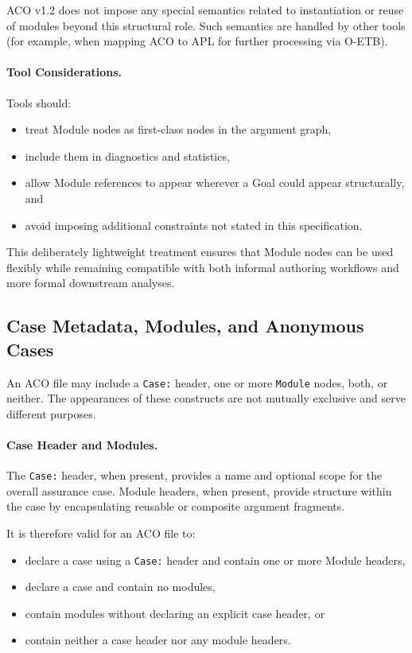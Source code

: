 \documentclass[11pt]{article}
\begin{document}
ACO v1.2 does not impose any special semantics related to instantiation or reuse of modules
beyond this structural role. Such semantics are handled by other tools (for example,
when mapping ACO to APL for further processing via O-ETB).

\paragraph{Tool Considerations.}
Tools should:
\begin{itemize}[leftmargin=2em]
  \item treat Module nodes as first-class nodes in the argument graph,
  \item include them in diagnostics and statistics,
  \item allow Module references to appear wherever a Goal could appear structurally, and
  \item avoid imposing additional constraints not stated in this specification.
\end{itemize}

This deliberately lightweight treatment ensures that Module nodes can be used
flexibly while remaining compatible with both informal authoring workflows and
more formal downstream analyses.

\subsection{Case Metadata, Modules, and Anonymous Cases}

An ACO file may include a \texttt{Case:} header, one or more \texttt{Module} nodes, both, or neither.
The appearances of these constructs are not mutually exclusive and serve different purposes.

\paragraph{Case Header and Modules.}
The \texttt{Case:} header, when present, provides a name and optional scope for the overall
assurance case. Module headers, when present, provide structure within the case by encapsulating
reusable or composite argument fragments.

It is therefore valid for an ACO file to:
\begin{itemize}[leftmargin=2em]
  \item declare a case using a \texttt{Case:} header and contain one or more Module headers,
  \item declare a case and contain no modules,
  \item contain modules without declaring an explicit case header, or
  \item contain neither a case header nor any module headers.
\end{itemize}
\end{document}
